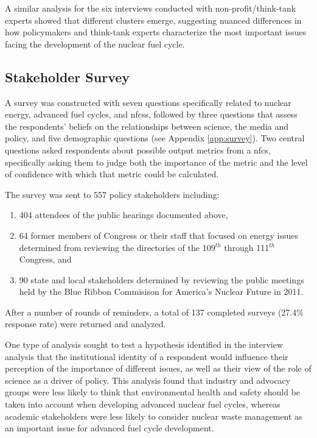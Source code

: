 A similar analysis for the six interviews conducted with non-profit/think-tank
experts showed that different clusters emerge, suggesting nuanced differences
in how policymakers and think-tank experts characterize the most important
issues facing the development of the nuclear fuel cycle.

\subsection{Stakeholder Survey}

A survey was constructed with seven questions specifically related to nuclear
energy, advanced fuel cycles, and \glspl{nfcs}, followed by three questions
that assess the respondents' beliefs on the relationships between science, the
media and policy, and five demographic questions (see Appendix
\ref{app:survey}).  Two central questions asked respondents about possible
output metrics from a \gls{nfcs}, specifically asking them to judge both the
importance of the metric and the level of confidence with which that metric
could be calculated.

The survey was sent to 557 policy stakeholders including:
\begin{enumerate}
\item 404 attendees of the public hearings documented above, 
\item 64 former members of Congress or their staff that focused on energy issues determined from reviewing the directories of the 109$^{th}$ through 111$^{th}$ Congress, and
\item 90 state and local stakeholders determined by reviewing the public
  meetings held by the Blue Ribbon Commisison for America's Nuclear Future in
  2011.
\end{enumerate}
After a number of rounds of reminders, a total of 137 completed surveys
(27.4\% response rate) were returned and analyzed.

One type of analysis sought to test a hypothesis identified in the interview
analysis that the institutional identity of a respondent would influence their
perception of the importance of different issues, as well as their view of the
role of science as a driver of policy.  This analysis found that industry and
advocacy groups were less likely to think that environmental health and safety
should be taken into account when developing advanced nuclear fuel cycles,
whereas academic stakeholders were less likely to consider nuclear waste
management as an important issue for advanced fuel cycle development.

